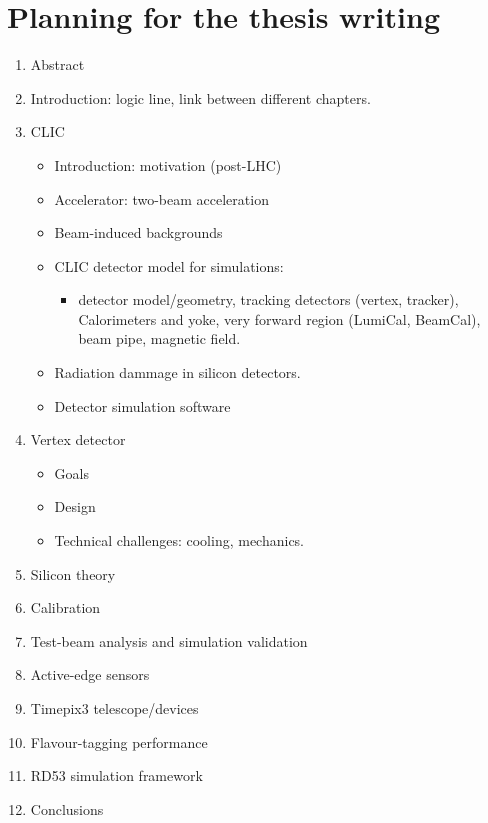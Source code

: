 \chapter{Planning for the thesis writing}

\begin{enumerate}

\item Abstract

\item Introduction: logic line, link between different chapters.

\item CLIC
  \begin{itemize}
  \item Introduction: motivation (post-LHC)
  \item Accelerator: two-beam acceleration
  \item Beam-induced backgrounds
  \item CLIC detector model for simulations:
    \begin{itemize} 
    \item detector model/geometry, tracking detectors (vertex, tracker), Calorimeters and yoke, very forward region (LumiCal, BeamCal), beam pipe, magnetic field.
    \end{itemize}
  \item Radiation dammage in silicon detectors.
  \item Detector simulation software
  \end{itemize}

\item Vertex detector
  \begin{itemize} 
  \item Goals
  \item Design
  \item Technical challenges: cooling, mechanics.
  \end{itemize}

\item Silicon theory

\item Calibration

\item Test-beam analysis and simulation validation

\item Active-edge sensors

\item Timepix3 telescope/devices

\item Flavour-tagging performance

\item RD53 simulation framework

\item Conclusions

\end{enumerate}